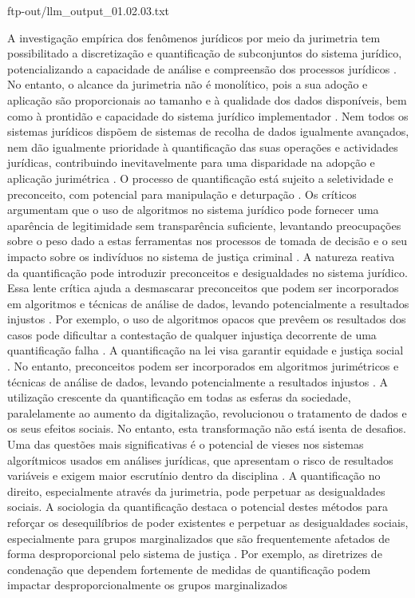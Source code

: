 ftp-out/llm_output_01.02.03.txt 

A investigação empírica dos fenômenos jurídicos por meio da jurimetria tem possibilitado a discretização e quantificação de subconjuntos do sistema jurídico, potencializando a capacidade de análise e compreensão dos processos jurídicos \cite{losano2006} . No entanto, o alcance da jurimetria não é monolítico, pois a sua adoção e aplicação são proporcionais ao tamanho e à qualidade dos dados disponíveis, bem como à prontidão e capacidade do sistema jurídico implementador \cite{losano2006}. Nem todos os sistemas jurídicos dispõem de sistemas de recolha de dados igualmente avançados, nem dão igualmente prioridade à quantificação das suas operações e actividades jurídicas, contribuindo inevitavelmente para uma disparidade na adopção e aplicação jurimétrica \cite{losano2006}. O processo de quantificação está sujeito a seletividade e preconceito, com potencial para manipulação e deturpação \cite{losano2006}. Os críticos argumentam que o uso de algoritmos no sistema jurídico pode fornecer uma aparência de legitimidade sem transparência suficiente, levantando preocupações sobre o peso dado a estas ferramentas nos processos de tomada de decisão e o seu impacto sobre os indivíduos no sistema de justiça criminal \cite{losano2006} . A natureza reativa da quantificação pode introduzir preconceitos e desigualdades no sistema jurídico. Essa lente crítica ajuda a desmascarar preconceitos que podem ser incorporados em algoritmos e técnicas de análise de dados, levando potencialmente a resultados injustos \cite{10.1590/dados.2022.65.3.267,10.3390/fi9040068}. Por exemplo, o uso de algoritmos opacos que prevêem os resultados dos casos pode dificultar a contestação de qualquer injustiça decorrente de uma quantificação falha \cite{10.1590/dados.2022.65.3.267,10.1057/s41599-020-0396-5}. A quantificação na lei visa garantir equidade e justiça social \cite{101007s1102402209481w}. No entanto, preconceitos podem ser incorporados em algoritmos jurimétricos e técnicas de análise de dados, levando potencialmente a resultados injustos \cite{10.1057/s41599-020-00557-0,10.5040/9781350220645}. A utilização crescente da quantificação em todas as esferas da sociedade, paralelamente ao aumento da digitalização, revolucionou o tratamento de dados e os seus efeitos sociais. No entanto, esta transformação não está isenta de desafios. Uma das questões mais significativas é o potencial de vieses nos sistemas algorítmicos usados em análises jurídicas, que apresentam o risco de resultados variáveis e exigem maior escrutínio dentro da disciplina \cite{10.1590/dados.2022.65.3.267,1023071190721}. A quantificação no direito, especialmente através da jurimetria, pode perpetuar as desigualdades sociais. A sociologia da quantificação destaca o potencial destes métodos para reforçar os desequilíbrios de poder existentes e perpetuar as desigualdades sociais, especialmente para grupos marginalizados que são frequentemente afetados de forma desproporcional pelo sistema de justiça \cite{10.1590/dados.2022.65.3.267,10.32586/rcda.v18i1. 585}. Por exemplo, as diretrizes de condenação que dependem fortemente de medidas de quantificação podem impactar desproporcionalmente os grupos marginalizados 